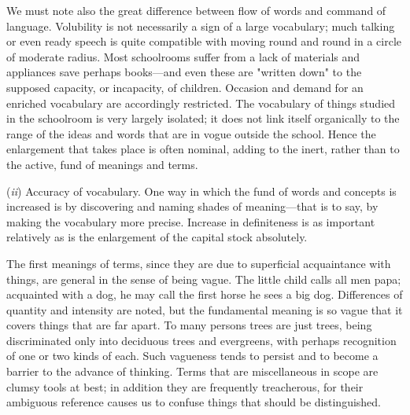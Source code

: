 \documentclass[letterpaper]{book}
\begin{document}
We must note also the great difference between flow of words and command
of language. Volubility is not necessarily a sign of a large vocabulary;
much talking or even ready speech is quite compatible with moving round
and round in a circle of moderate radius. Most schoolrooms suffer from a
lack of materials and appliances save perhaps books---and even these are
"written down" to the supposed capacity, or incapacity, of children.
Occasion and demand for an enriched vocabulary are accordingly
restricted. The vocabulary of things studied in the schoolroom is very
largely isolated; it does not link itself organically to the range of
the ideas and words that are in vogue outside the school. Hence the
enlargement that takes place is often
nominal,
adding to the inert, rather than to the active, fund of meanings and
terms.

(\emph{ii}) Accuracy of vocabulary. One way in which the fund of words
and concepts is increased is by discovering and naming shades of
meaning---that is to say, by making the vocabulary more precise.
Increase in definiteness is as important relatively as is the
enlargement of the capital stock absolutely.


The first meanings of terms, since they are due to superficial
acquaintance with things, are general in the sense of being vague. The
little child calls all men papa; acquainted with a dog, he may call the
first horse he sees a big dog. Differences of quantity and intensity are
noted, but the fundamental meaning is so vague that it covers things
that are far apart. To many persons trees are just trees, being
discriminated only into deciduous trees and evergreens, with perhaps
recognition of one or two kinds of each. Such vagueness tends to persist
and to become a barrier to the advance of thinking. Terms that are
miscellaneous in scope are clumsy tools at best; in addition they are
frequently treacherous, for their ambiguous reference causes us to
confuse things that should be distinguished.

\end{document}
